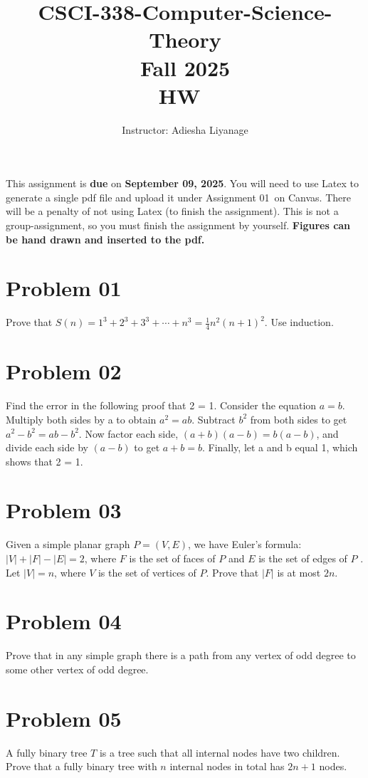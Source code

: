 \documentclass{article}
\title{CSCI-338-Computer-Science-Theory\\Fall 2025 \\HW~\assignmentnumber}
\author{Instructor: Adiesha Liyanage }
\date{}
\newcommand{\assignmentnumber}{01~}
\begin{document}
\maketitle
This assignment is \textbf{due} on \textbf{September 09, 2025}. You will need to use Latex to generate a single pdf file and upload it under Assignment \assignmentnumber on Canvas. There will be a penalty of not using Latex (to finish the assignment). This is not a group-assignment, so you must finish the assignment by yourself. \textbf{Figures can be hand drawn and inserted to the pdf.}

\section{Problem 01}
Prove that \(S(n) = 1^3 + 2^3 + 3^3 + \cdots + n^3 = \frac{1}{4}n^2(n+1)^2\). Use induction.

\section{Problem 02}
Find the error in the following proof that 2 = 1.
Consider the equation \(a = b\). Multiply both sides by a to obtain $a^2 = ab$. Subtract $b^2$ from both sides to get $a^2 - b^2 = ab - b^2$. Now factor each side, $(a+b)(a-b) = b(a-b)$, and divide each side by $(a-b)$ to get $a+b = b$. Finally, let a and b equal 1, which shows that 2 = 1.


\section{Problem 03}
Given a simple planar graph $P = (V, E)$, we have Euler’s formula: $|V | + |F | - |E| = 2$, where $F$ is the set of faces of $P$ and $E$ is the set of edges of $P$ . Let $|V | = n$, where $V$ is the set of vertices of $P$. Prove that $|F|$ is at most $2n$.

\section{Problem 04}
Prove that in any simple graph there is a path from any vertex of odd degree to some other vertex of odd degree.


\section{Problem 05}
A fully binary tree $T$ is a tree such that all internal nodes have two children. Prove that a fully binary tree with $n$ internal nodes in total has $2n + 1$ nodes.
\end{document}
